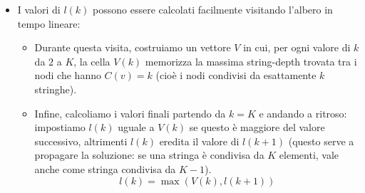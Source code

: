 \begin{itemize}
    \item I valori di $l(k)$ possono essere calcolati facilmente visitando l'albero in tempo lineare:
    \begin{itemize}
        \item Durante questa visita, costruiamo un vettore $V$ in cui, per ogni valore di $k$ da $2$ a $K$, la cella $V(k)$ memorizza la massima string-depth trovata tra i nodi che hanno $C(v) = k$ (cioè i nodi condivisi da esattamente $k$ stringhe).
        \item Infine, calcoliamo i valori finali partendo da $k = K$ e andando a ritroso: impostiamo $l(k)$ uguale a $V(k)$ se questo è maggiore del valore successivo, altrimenti $l(k)$ eredita il valore di $l(k+1)$ (questo serve a propagare la soluzione: se una stringa è condivisa da $K$ elementi, vale anche come stringa condivisa da $K-1$).
        $$
            l(k) = \max(V(k), l(k+1))
        $$
    \end{itemize}
\end{itemize}




